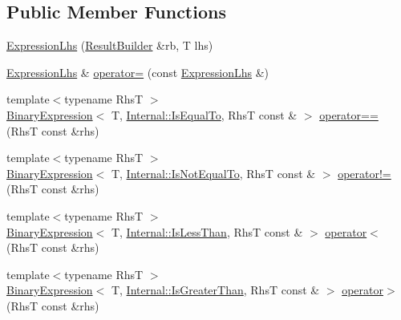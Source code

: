 \subsection*{Public Member Functions}
\begin{DoxyCompactItemize}
\item 
\hyperlink{class_catch_1_1_expression_lhs_aa829588def6146a94fb75de9c4cc482a}{Expression\+Lhs} (\hyperlink{class_catch_1_1_result_builder}{Result\+Builder} \&rb, T lhs)
\item 
\hyperlink{class_catch_1_1_expression_lhs}{Expression\+Lhs} \& \hyperlink{class_catch_1_1_expression_lhs_a60d50fe8adcaabcb7c93747ddbae5993}{operator=} (const \hyperlink{class_catch_1_1_expression_lhs}{Expression\+Lhs} \&)
\item 
{\footnotesize template$<$typename RhsT $>$ }\\\hyperlink{class_catch_1_1_binary_expression}{Binary\+Expression}$<$ T, \hyperlink{namespace_catch_1_1_internal_ae3f96598a7858155750bf38e7295d83ea30e0accba6ec8384f4383b04dd2a6a9e}{Internal\+::\+Is\+Equal\+To}, RhsT const  \& $>$ \hyperlink{class_catch_1_1_expression_lhs_abebe4afc079c91ae548ab8fdba6c77f2}{operator==} (RhsT const \&rhs)
\item 
{\footnotesize template$<$typename RhsT $>$ }\\\hyperlink{class_catch_1_1_binary_expression}{Binary\+Expression}$<$ T, \hyperlink{namespace_catch_1_1_internal_ae3f96598a7858155750bf38e7295d83ea1e1699cf7d3dbee0908f1a123da2456d}{Internal\+::\+Is\+Not\+Equal\+To}, RhsT const  \& $>$ \hyperlink{class_catch_1_1_expression_lhs_a3bc08bb2b9c27678e2628faa73645144}{operator!=} (RhsT const \&rhs)
\item 
{\footnotesize template$<$typename RhsT $>$ }\\\hyperlink{class_catch_1_1_binary_expression}{Binary\+Expression}$<$ T, \hyperlink{namespace_catch_1_1_internal_ae3f96598a7858155750bf38e7295d83eabbbfc41706595e50acbefa8408004b93}{Internal\+::\+Is\+Less\+Than}, RhsT const  \& $>$ \hyperlink{class_catch_1_1_expression_lhs_a919c48e52ff1be5f7329920d4da8e92f}{operator$<$} (RhsT const \&rhs)
\item 
{\footnotesize template$<$typename RhsT $>$ }\\\hyperlink{class_catch_1_1_binary_expression}{Binary\+Expression}$<$ T, \hyperlink{namespace_catch_1_1_internal_ae3f96598a7858155750bf38e7295d83eac0e8866139e99803d169595af70f6c22}{Internal\+::\+Is\+Greater\+Than}, RhsT const  \& $>$ \hyperlink{class_catch_1_1_expression_lhs_a52981d92ec6aad872660ae7df1abb33a}{operator$>$} (RhsT const \&rhs)

\end{DoxyCompactItemize}
